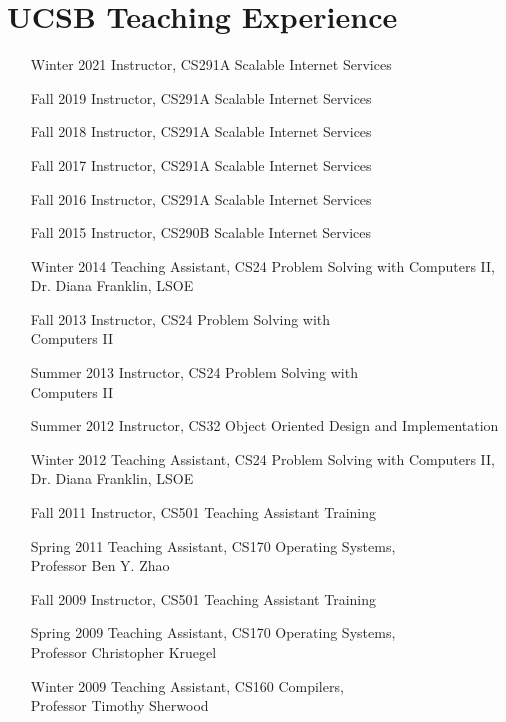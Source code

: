 \documentclass[10pt,letterpaper,oneside,twocolumn]{article}
\begin{document}
\section{UCSB Teaching Experience}
\begin{itemize}
  \item [Winter 2021] Instructor, CS291A Scalable Internet Services
  \item [Fall 2019] Instructor, CS291A Scalable Internet Services
  \item [Fall 2018] Instructor, CS291A Scalable Internet Services
  \item [Fall 2017] Instructor, CS291A Scalable Internet Services
  \item [Fall 2016] Instructor, CS291A Scalable Internet Services
  \item [Fall 2015] Instructor, CS290B Scalable Internet Services
  \item [Winter 2014] Teaching Assistant, CS24 Problem Solving with Computers
    II, Dr. Diana Franklin, LSOE
  \item [Fall 2013] Instructor, CS24 Problem Solving with\\ Computers II
  \item [Summer 2013] Instructor, CS24 Problem Solving with\\ Computers II
  \item [Summer 2012] Instructor, CS32 Object Oriented Design and
    Implementation
  \item [Winter 2012] Teaching Assistant, CS24 Problem Solving with Computers
    II, Dr. Diana Franklin, LSOE
  \item [Fall 2011] Instructor, CS501 Teaching Assistant Training
  \item [Spring 2011] Teaching Assistant, CS170 Operating Systems,\\ Professor
    Ben Y. Zhao
  \item [Fall 2009] Instructor, CS501 Teaching Assistant Training
  \item [Spring 2009] Teaching Assistant, CS170 Operating Systems,\\ Professor
    Christopher Kruegel
  \item [Winter 2009] Teaching Assistant, CS160 Compilers,\\ Professor Timothy
    Sherwood
\end{itemize}
\end{document}
